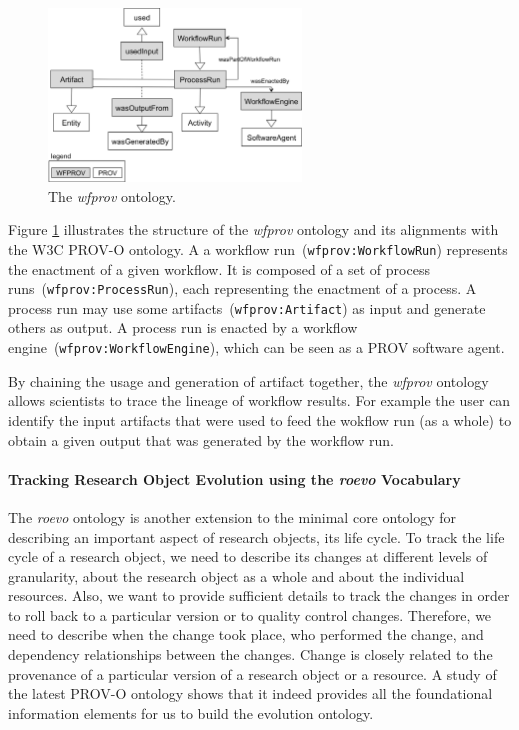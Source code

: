 \begin{figure}[ht]
  \centering
  \includegraphics[width=0.6\textwidth]{Figures/wfprov.png}
  \caption{The \textit{wfprov} ontology.}
  \label{fig:wfprov}
\end{figure}

Figure \ref{fig:wfprov} illustrates the structure of the \textit{wfprov} ontology and its alignments with the W3C PROV-O ontology. A a workflow run~(\texttt{wfprov:WorkflowRun}) represents the enactment of a given workflow. It is composed of a set of process runs~(\texttt{wfprov:ProcessRun}), each representing the enactment of a process. A process run may use some artifacts~(\texttt{wfprov:Artifact}) as input and generate others as output. A process run is enacted by a workflow engine~(\texttt{wfprov:WorkflowEngine}), which can be seen as a PROV software agent.

By chaining the usage and generation of artifact together, the \textit{wfprov} ontology allows scientists to trace the lineage of workflow results. For example the user can identify the input artifacts that were used to feed the wokflow run (as a whole) to obtain a given output that was generated by the workflow run.

\paragraph{Tracking Research Object Evolution using the \textit{roevo} Vocabulary}
The \textit{roevo} ontology is another extension to the minimal core ontology for describing an important aspect of research objects, its life cycle.
To track the life cycle of a research object, we need to describe its changes at different levels of granularity, about the research object as a whole and about the individual resources. Also, we want to provide sufficient details to track the changes in order to roll back to a particular version or to quality control changes. Therefore, we need to describe when the change took place, who performed the change, and dependency relationships between the changes. %
Change is closely related to the provenance of a particular version of a research object or a resource. A study of the latest PROV-O ontology shows that it indeed provides all the foundational information elements for us to build the evolution ontology. 

